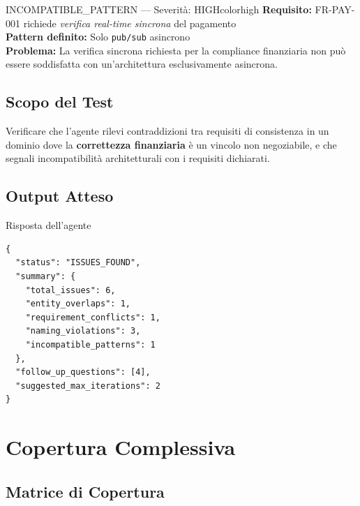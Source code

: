\documentclass[12pt,a4paper]{report}
\begin{document}
\begin{issuebox}{INCOMPATIBLE\_PATTERN --- Severità: HIGH}{colorhigh}
\textbf{Requisito:} FR-PAY-001 richiede \textit{verifica real-time sincrona} del pagamento \\
\textbf{Pattern definito:} Solo \texttt{pub/sub} asincrono \\
\textbf{Problema:} La verifica sincrona richiesta per la compliance finanziaria non
può essere soddisfatta con un'architettura esclusivamente asincrona.
\end{issuebox}
\clearpage
\section{Scopo del Test}

Verificare che l'agente rilevi contraddizioni tra requisiti di consistenza in un dominio
dove la \textbf{correttezza finanziaria} è un vincolo non negoziabile, e che segnali
incompatibilità architetturali con i requisiti dichiarati.

\section{Output Atteso}

\begin{outputbox}{Risposta dell'agente}
\begin{lstlisting}
{
  "status": "ISSUES_FOUND",
  "summary": {
    "total_issues": 6,
    "entity_overlaps": 1,
    "requirement_conflicts": 1,
    "naming_violations": 3,
    "incompatible_patterns": 1
  },
  "follow_up_questions": [4],
  "suggested_max_iterations": 2
}
\end{lstlisting}
\end{outputbox}

\clearpage

\chapter{Copertura Complessiva}

\section{Matrice di Copertura}
\end{document}
